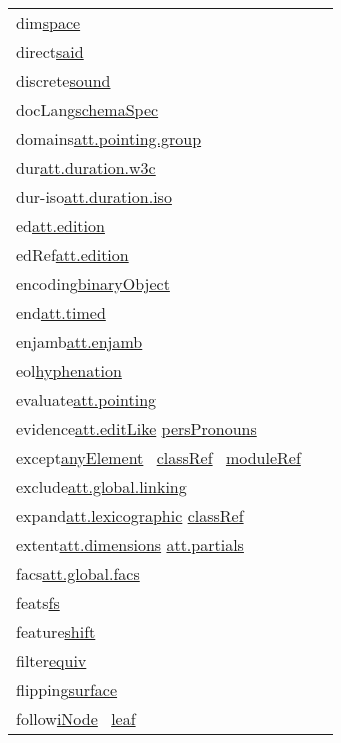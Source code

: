 \begin{longtable}{L{.2\textwidth}P{.8\textwidth}}
dim\tabcellsep \hyperref[TEI.space]{space} \\
direct\tabcellsep \hyperref[TEI.said]{said} \\
discrete\tabcellsep \hyperref[TEI.sound]{sound} \\
docLang\tabcellsep \hyperref[TEI.schemaSpec]{schemaSpec} \\
domains\tabcellsep \hyperref[TEI.att.pointing.group]{att.pointing.group}\\
dur\tabcellsep \hyperref[TEI.att.duration.w3c]{att.duration.w3c}\\
dur-iso\tabcellsep \hyperref[TEI.att.duration.iso]{att.duration.iso}\\
ed\tabcellsep \hyperref[TEI.att.edition]{att.edition}\\
edRef\tabcellsep \hyperref[TEI.att.edition]{att.edition}\\
encoding\tabcellsep \hyperref[TEI.binaryObject]{binaryObject} \\
end\tabcellsep \hyperref[TEI.att.timed]{att.timed}\\
enjamb\tabcellsep \hyperref[TEI.att.enjamb]{att.enjamb}\\
eol\tabcellsep \hyperref[TEI.hyphenation]{hyphenation} \\
evaluate\tabcellsep \hyperref[TEI.att.pointing]{att.pointing}\\
evidence\tabcellsep \hyperref[TEI.att.editLike]{att.editLike} \hyperref[TEI.persPronouns]{persPronouns} \\
except\tabcellsep \hyperref[TEI.anyElement]{anyElement}  \hyperref[TEI.classRef]{classRef}  \hyperref[TEI.moduleRef]{moduleRef} \\
exclude\tabcellsep \hyperref[TEI.att.global.linking]{att.global.linking}\\
expand\tabcellsep \hyperref[TEI.att.lexicographic]{att.lexicographic} \hyperref[TEI.classRef]{classRef} \\
extent\tabcellsep \hyperref[TEI.att.dimensions]{att.dimensions} \hyperref[TEI.att.partials]{att.partials}\\
facs\tabcellsep \hyperref[TEI.att.global.facs]{att.global.facs}\\
feats\tabcellsep \hyperref[TEI.fs]{fs} \\
feature\tabcellsep \hyperref[TEI.shift]{shift} \\
filter\tabcellsep \hyperref[TEI.equiv]{equiv} \\
flipping\tabcellsep \hyperref[TEI.surface]{surface} \\
follow\tabcellsep \hyperref[TEI.iNode]{iNode}  \hyperref[TEI.leaf]{leaf} \\

\end{longtable}
